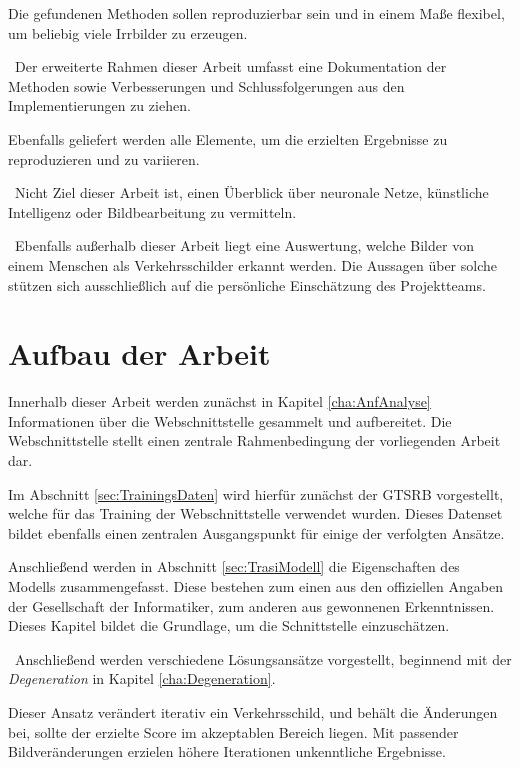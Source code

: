 Die gefundenen Methoden sollen reproduzierbar sein und in einem Maße flexibel, um beliebig viele Irrbilder zu erzeugen. 

~\newline Der erweiterte Rahmen dieser Arbeit umfasst eine Dokumentation der Methoden sowie Verbesserungen und Schlussfolgerungen aus den Implementierungen zu ziehen. 

Ebenfalls geliefert werden alle Elemente, um die erzielten Ergebnisse zu reproduzieren und zu variieren. 

~\newline Nicht Ziel dieser Arbeit ist, einen Überblick über neuronale Netze, künstliche Intelligenz oder Bildbearbeitung zu vermitteln. 

~\newline Ebenfalls außerhalb dieser Arbeit liegt eine Auswertung, welche Bilder von einem Menschen als Verkehrsschilder erkannt werden. Die Aussagen über solche stützen sich ausschließlich auf die persönliche Einschätzung des Projektteams. 
\section{Aufbau der Arbeit}
Innerhalb dieser Arbeit werden zunächst in Kapitel \ref{cha:AnfAnalyse} Informationen über die Webschnittstelle gesammelt und aufbereitet. Die Webschnittstelle stellt einen zentrale Rahmenbedingung der vorliegenden Arbeit dar.

Im Abschnitt \ref{sec:TrainingsDaten} wird hierfür zunächst der \ac{GTSRB} vorgestellt, welche für das Training der Webschnittstelle verwendet wurden. Dieses Datenset bildet ebenfalls einen zentralen Ausgangspunkt für einige der verfolgten Ansätze.

Anschließend werden in Abschnitt \ref{sec:TrasiModell} die Eigenschaften des Modells zusammengefasst. 
Diese bestehen zum einen aus den offiziellen Angaben der Gesellschaft der Informatiker, zum anderen aus gewonnenen Erkenntnissen. Dieses Kapitel bildet die Grundlage, um die Schnittstelle einzuschätzen. 

~\newline Anschließend werden verschiedene Lösungsansätze vorgestellt, beginnend mit der \textit{Degeneration} in Kapitel \ref{cha:Degeneration}. 

Dieser Ansatz verändert iterativ ein Verkehrsschild, und behält die Änderungen bei, sollte der erzielte Score im akzeptablen Bereich liegen. Mit passender Bildveränderungen erzielen höhere Iterationen unkenntliche Ergebnisse. 

